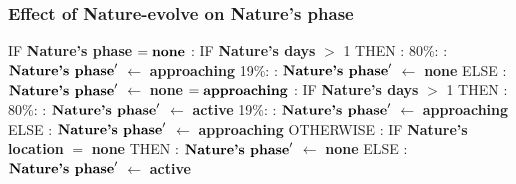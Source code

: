 \documentclass{article}%
\begin{document}
%
\subsubsection{Effect of Nature{-}evolve on Nature's phase}%
\label{ssubsec:Effect of Nature{-}evolve on Nature's phase}%
\begin{flushleft}%
IF %
\textbf{Nature's phase}%
\linebreak%
\hspace*{2em}%
$= \mbox{\textbf{none}}$%
: %
IF %
\textbf{Nature's days}%
$>$%
1%
\linebreak%
\hspace*{4em}%
THEN %
: %
\linebreak%
\hspace*{6em}%
80\%:%
: %
$\mbox{\textbf{Nature's phase}} '$%
$\leftarrow$%
\textbf{approaching}%
\linebreak%
\hspace*{6em}%
19\%:%
: %
$\mbox{\textbf{Nature's phase}} '$%
$\leftarrow$%
\textbf{none}%
\linebreak%
\hspace*{4em}%
ELSE %
: %
$\mbox{\textbf{Nature's phase}} '$%
$\leftarrow$%
\textbf{none}%
\linebreak%
\hspace*{2em}%
$= \mbox{\textbf{approaching}}$%
: %
IF %
\textbf{Nature's days}%
$>$%
1%
\linebreak%
\hspace*{4em}%
THEN %
: %
\linebreak%
\hspace*{6em}%
80\%:%
: %
$\mbox{\textbf{Nature's phase}} '$%
$\leftarrow$%
\textbf{active}%
\linebreak%
\hspace*{6em}%
19\%:%
: %
$\mbox{\textbf{Nature's phase}} '$%
$\leftarrow$%
\textbf{approaching}%
\linebreak%
\hspace*{4em}%
ELSE %
: %
$\mbox{\textbf{Nature's phase}} '$%
$\leftarrow$%
\textbf{approaching}%
\linebreak%
\hspace*{2em}%
OTHERWISE %
: %
IF %
\textbf{Nature's location}%
$=$%
\textbf{none}%
\linebreak%
\hspace*{4em}%
THEN %
: %
$\mbox{\textbf{Nature's phase}} '$%
$\leftarrow$%
\textbf{none}%
\linebreak%
\hspace*{4em}%
ELSE %
: %
$\mbox{\textbf{Nature's phase}} '$%
$\leftarrow$%
\textbf{active}%
\end{flushleft}
\end{document}
